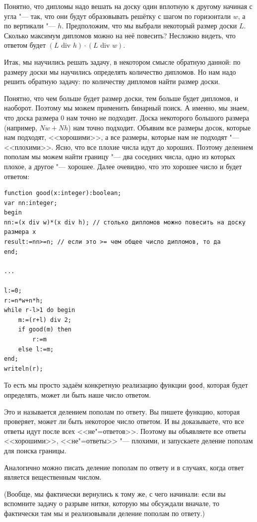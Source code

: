 \documentclass[a4paper,10pt]{problems}
\begin{document}
Понятно, что дипломы надо вешать на доску один вплотную к другому 
начиная с угла "--- так, что они будут образовывать решётку с шагом
по горизонтали $w$, а по вертикали "--- $h$.
Предположим, что мы выбрали некоторый размер доски $L$.
Сколько максимум дипломов можно на неё повесить?
Несложно видеть, что ответом будет $(L\mbox{ div }h)\cdot(L\mbox{ div }w)$.

Итак, мы научились решать задачу, в некотором смысле обратную данной:
по размеру доски мы научились определять количество дипломов.
Но нам надо решить обратную задачу: по количеству дипломов найти размер доски.

Понятно, что чем больше будет размер доски, тем больше будет
дипломов, и наоборот. 
Поэтому мы можем применить бинарный поиск. 
А именно, мы знаем, что доска размера 0 нам точно не подходит.
Доска некоторого большого размера (например, $Nw+Nh$) нам точно подходит.
Объявим все размеры досок, которые нам подходят, <<хорошими>>,
а все размеры, которые нам не подходят "--- <<плохими>>.
Ясно, что все плохие числа идут до хороших.
Поэтому делением пополам мы можем найти границу "--- два соседних числа,
одно из которых плохое, а другое "--- хорошее.
Далее очевидно, что это хорошее число и будет ответом:
\begin{codesampleo}\begin{verbatim}
function good(x:integer):boolean;
var nn:integer;
begin
nn:=(x div w)*(x div h); // столько дипломов можно повесить на доску размера x
result:=nn>=n; // если это >= чем общее число дипломов, то да
end;

...

l:=0;
r:=n*w+n*h;  
while r-l>1 do begin    
    m:=(r+l) div 2;
    if good(m) then
        r:=m
    else l:=m;
end;
writeln(r);
\end{verbatim}
\end{codesampleo}

То есть мы просто задаём конкретную реализацию функции \verb`good`,
которая будет определять, может ли быть наше число ответом.

Это и называется делением пополам по ответу. 
Вы пишете функцию, которая проверяет, может ли быть некоторое число ответом.
И вы доказываете, что все ответы идут после всех <<не"=ответов>>.
Поэтому вы объявляете все ответы <<хорошими>>, <<не"=ответы>> "--- плохими,
и запускаете деление пополам для поиска границы.

Аналогично можно писать деление пополам по ответу и в случаях, когда ответ является
вещественным числом.

(Вообще, мы фактически вернулись к тому же, с чего начинали: если вы вспомните
задачу о разрыве нитки, которую мы обсуждали вначале, то фактически там мы
и реализовывали деление пополам по ответу.)

\end{document}
